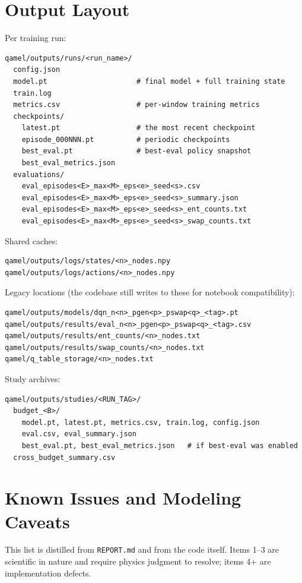 \documentclass[11pt]{article}
\newcommand{\file}[1]{\texttt{\small #1}}
\begin{document}
\section{Output Layout}
\label{sec:outputs}

Per training run:
\begin{verbatim}
qamel/outputs/runs/<run_name>/
  config.json
  model.pt                     # final model + full training state
  train.log
  metrics.csv                  # per-window training metrics
  checkpoints/
    latest.pt                  # the most recent checkpoint
    episode_000NNN.pt          # periodic checkpoints
    best_eval.pt               # best-eval policy snapshot
    best_eval_metrics.json
  evaluations/
    eval_episodes<E>_max<M>_eps<e>_seed<s>.csv
    eval_episodes<E>_max<M>_eps<e>_seed<s>_summary.json
    eval_episodes<E>_max<M>_eps<e>_seed<s>_ent_counts.txt
    eval_episodes<E>_max<M>_eps<e>_seed<s>_swap_counts.txt
\end{verbatim}
Shared caches:
\begin{verbatim}
qamel/outputs/logs/states/<n>_nodes.npy
qamel/outputs/logs/actions/<n>_nodes.npy
\end{verbatim}
Legacy locations (the codebase still writes to these for notebook compatibility):
\begin{verbatim}
qamel/outputs/models/dqn_n<n>_pgen<p>_pswap<q>_<tag>.pt
qamel/outputs/results/eval_n<n>_pgen<p>_pswap<q>_<tag>.csv
qamel/outputs/results/ent_counts/<n>_nodes.txt
qamel/outputs/results/swap_counts/<n>_nodes.txt
qamel/q_table_storage/<n>_nodes.txt
\end{verbatim}
Study archives:
\begin{verbatim}
qamel/outputs/studies/<RUN_TAG>/
  budget_<B>/
    model.pt, latest.pt, metrics.csv, train.log, config.json
    eval.csv, eval_summary.json
    best_eval.pt, best_eval_metrics.json   # if best-eval was enabled
  cross_budget_summary.csv
\end{verbatim}

\section{Known Issues and Modeling Caveats}
\label{sec:issues}

This list is distilled from \file{REPORT.md} and from the code itself. Items 1--3 are scientific in nature and require physics judgment to resolve; items 4+ are implementation defects.
\end{document}
